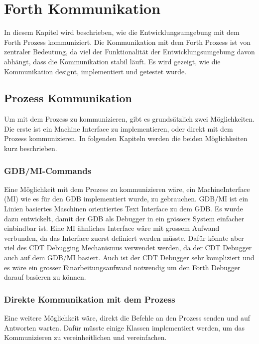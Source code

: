 \chapter{Forth Kommunikation}
\label{forthcommunication}

In diesem Kapitel wird beschrieben, wie die Entwicklungsumgebung mit dem Forth Prozess kommuniziert. Die Kommunikation mit dem Forth Prozess ist von zentraler Bedeutung, da viel der Funktionalität der Entwicklungsumgebung davon abhängt, dass die Kommunikation stabil läuft. Es wird gezeigt, wie die Kommunikation designt, implementiert und getestet wurde.

\section{Prozess Kommunikation}
Um mit dem Prozess zu kommunizieren, gibt es grundsätzlich zwei Möglichkeiten. Die erste ist ein Machine Interface zu implementieren, oder direkt mit dem Prozess kommunizieren. In folgenden Kapiteln werden die beiden Möglichkeiten kurz beschrieben.

\subsection{GDB/MI-Commands}

Eine Möglichkeit mit dem Prozess zu kommunizieren wäre, ein MachineInterface (MI) wie es für den GDB implementiert wurde, zu gebrauchen. GDB/MI ist ein Linien basiertes Maschinen orientiertes Text Interface zu dem GDB. Es wurde dazu entwickelt, damit der GDB als Debugger in ein grössers System einfacher einbindbar ist.\cite{gdb} Eine MI ähnliches Interface wäre mit grossem Aufwand verbunden, da das Interface zuerst definiert werden müsste. Dafür könnte aber viel des CDT Debugging Mechanismus verwendet werden, da der CDT Debugger auch auf dem GDB/MI basiert. Auch ist der CDT Debugger sehr kompliziert\cite{mieclipse} und es wäre ein grosser Einarbeitungsaufwand notwendig um den Forth Debugger darauf basieren zu können.\cite{mieclipse}

\subsection{Direkte Kommunikation mit dem Prozess}

Eine weitere Möglichkeit wäre, direkt die Befehle an den Prozess senden und auf Antworten warten. Dafür müsste einige Klassen implementiert werden, um das Kommunizieren zu vereinheitlichen und vereinfachen.

